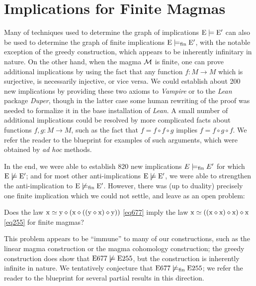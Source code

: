 \section{Implications for Finite Magmas}\label{austin-sec}

Many of techniques used to determine the graph of implications $\mathrm{E} \models \mathrm{E}'$ can also be used to determine the graph of finite implications $\mathrm{E} \models_{\mathrm{fin}} \mathrm{E}'$, with the notable exception of the greedy construction, which appears to be inherently infinitary in nature.  On the other hand, when the magma ${\mathcal{M}}$ is finite, one can prove additional implications by using the fact that any function $f \colon M \to M$ which is surjective, is necessarily injective, or vice versa.  We could establish about 200 new implications by providing these two axioms to \emph{Vampire} or to the \emph{Lean} package \emph{Duper}, though in the latter case some human rewriting of the proof was needed to formalize it in the base installation of \emph{Lean}.  A small number of additional implications could be resolved by more complicated facts about functions $f,g \colon M \to M$, such as the fact that $f = f \circ f \circ g$ implies $f = f \circ g \circ f$.  We refer the reader to the blueprint for examples of such arguments, which were obtained by \emph{ad hoc} methods.

In the end, we were able to establish $820$ new implications $E \models_{\mathrm{fin}} E'$ for which $\mathrm{E} \not \models \mathrm{E}'$; and for most other anti-implications $\mathrm{E} \not \models \mathrm{E}'$, we were able to strengthen the anti-implication to $\mathrm{E} \not \models_{\mathrm{fin}} \mathrm{E}'$.  However, there was (up to duality) precisely one finite implication which we could not settle, and leave as an open problem:

\begin{problem}  Does the law $\mathrm{x} \simeq \mathrm{y} \diamond (\mathrm{x} \diamond ((\mathrm{y} \diamond \mathrm{x}) \diamond \mathrm{y}))$ \eqref{eq677} imply the law $\mathrm{x} \simeq ((\mathrm{x} \diamond \mathrm{x}) \diamond \mathrm{x}) \diamond \mathrm{x}$ \eqref{eq255} for finite magmas?
\end{problem}

This problem appears to be ``immune'' to many of our constructions, such as the linear magma construction or the magma cohomology construction; the greedy construction does show that $\mathrm{E}677 \not \models \mathrm{E}255$, but the construction is inherently infinite in nature.  We tentatively conjecture that $\mathrm{E}677 \not \models_{\mathrm{fin}} \mathrm{E}255$; we refer the reader to the blueprint for several partial results in this direction.
